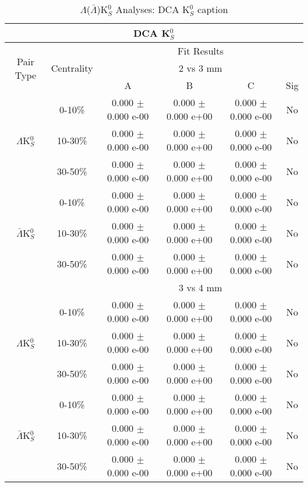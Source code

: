 \documentclass[../AnalysisNoteJBuxton.tex]{subfiles}
\begin{document}
\begin{table}
 \centering
 \begin{tabular}{|c|c|c|c|c|c|}
  \multicolumn{6}{c}{DCA K$^{0}_{S}$} \\
  \hline
  \multirow{3}{*}{Pair Type} & \multirow{3}{*}{Centrality} & \multicolumn{4}{c|}{Fit Results} \\
  \cline{3-6}
   & & \multicolumn{4}{c|}{2 vs 3 mm} \\
  \cline{3-6}
   & & A & B & C & Sig \\
  \hline  
  \multirow{3}{*}{$\Lambda$K$^{0}_{S}$}
   &  0-10\% & 0.000 $\pm$ 0.000 e-00 & 0.000 $\pm$ 0.000 e+00 & 0.000 $\pm$ 0.000 e-00 & No \\
   & 10-30\% & 0.000 $\pm$ 0.000 e-00 & 0.000 $\pm$ 0.000 e+00 & 0.000 $\pm$ 0.000 e-00 & No \\
   & 30-50\% & 0.000 $\pm$ 0.000 e-00 & 0.000 $\pm$ 0.000 e+00 & 0.000 $\pm$ 0.000 e-00 & No \\
  \hline
  \multirow{3}{*}{$\bar{\Lambda}$K$^{0}_{S}$}  
   &  0-10\% & 0.000 $\pm$ 0.000 e-00 & 0.000 $\pm$ 0.000 e+00 & 0.000 $\pm$ 0.000 e-00 & No \\
   & 10-30\% & 0.000 $\pm$ 0.000 e-00 & 0.000 $\pm$ 0.000 e+00 & 0.000 $\pm$ 0.000 e-00 & No \\
   & 30-50\% & 0.000 $\pm$ 0.000 e-00 & 0.000 $\pm$ 0.000 e+00 & 0.000 $\pm$ 0.000 e-00 & No \\
  \hline 
  \multicolumn{2}{|c|}{} & \multicolumn{4}{c|}{3 vs 4 mm} \\
  \hline  
  \multirow{3}{*}{$\Lambda$K$^{0}_{S}$}   
   &  0-10\% & 0.000 $\pm$ 0.000 e-00 & 0.000 $\pm$ 0.000 e+00 & 0.000 $\pm$ 0.000 e-00 & No \\
   & 10-30\% & 0.000 $\pm$ 0.000 e-00 & 0.000 $\pm$ 0.000 e+00 & 0.000 $\pm$ 0.000 e-00 & No \\
   & 30-50\% & 0.000 $\pm$ 0.000 e-00 & 0.000 $\pm$ 0.000 e+00 & 0.000 $\pm$ 0.000 e-00 & No \\
  \hline  
  \multirow{3}{*}{$\bar{\Lambda}$K$^{0}_{S}$}
   &  0-10\% & 0.000 $\pm$ 0.000 e-00 & 0.000 $\pm$ 0.000 e+00 & 0.000 $\pm$ 0.000 e-00 & No \\
   & 10-30\% & 0.000 $\pm$ 0.000 e-00 & 0.000 $\pm$ 0.000 e+00 & 0.000 $\pm$ 0.000 e-00 & No \\
   & 30-50\% & 0.000 $\pm$ 0.000 e-00 & 0.000 $\pm$ 0.000 e+00 & 0.000 $\pm$ 0.000 e-00 & No \\
  \hline
 \end{tabular}
 \caption{$\Lambda$($\bar{\Lambda}$)K$^{0}_{S}$ Analyses: DCA K$^{0}_{S}$ caption}
 \label{tab:K0DcaLamK0Full}
\end{table}
\end{document}

